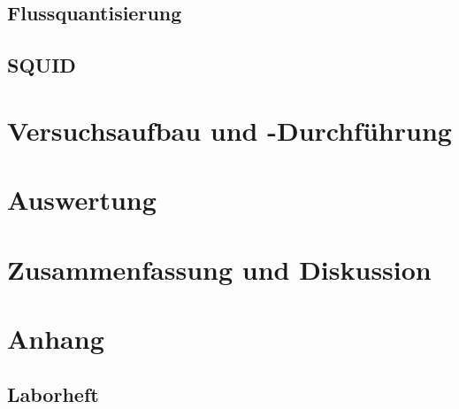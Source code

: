 \documentclass[12pt]{article}
\begin{document}
\subsection{Flussquantisierung}

\subsection{SQUID}



\newpage
\section{Versuchsaufbau und -Durchführung}




\newpage
\section{Auswertung}


\newpage
\section{Zusammenfassung und Diskussion}


\newpage
\section{Anhang}




%


%

\subsection{Laborheft}
\end{document}
